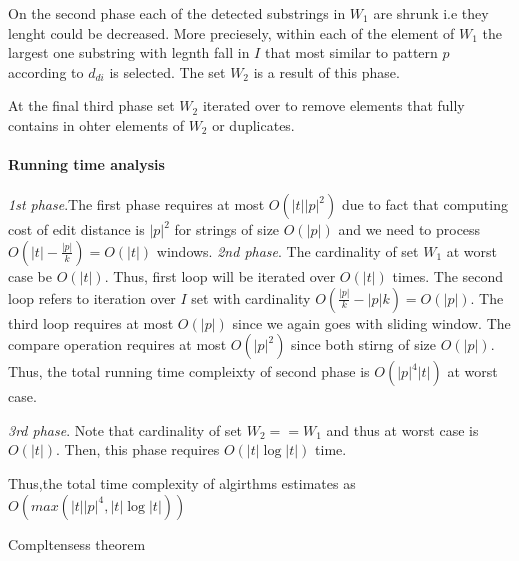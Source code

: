 On the second phase  each of the detected substrings in $W_{1}$ are shrunk i.e they lenght could be decreased.
More preciesely, within each of the element of $W_{1}$ the largest one substring with legnth fall in $I$ that most similar to pattern $p$ according to $d_{di}$ is selected.
The set $W_{2}$ is a result of this phase.

At the final third phase  set $W_{2}$ iterated over to remove elements that fully contains in ohter elements of $W_{2}$ or duplicates.

\paragraph{Running time analysis}
\emph{1st phase}.The first phase requires at most  $O(|t||p|^2)$ due to fact
that computing cost of edit distance is $|p|^2$ for strings of size $O(|p|)$ and we need to process $O(|t|-\frac{|p|}{k})=O(|t|)$ windows.
\emph{2nd phase}. 
The cardinality of set $W_{1}$  at worst case be $O(|t|)$.
Thus, first loop will be iterated over $O(|t|)$ times.
The second loop refers to iteration over $I$ set with cardinality $O(\frac{|p|}{k}-|p|k) = O(|p|)$.
The third loop requires at most $O(|p|)$ since we again goes with sliding window.
The compare operation requires at most $O(|p|^2)$ since both
stirng of size $O(|p|)$.
Thus, the total running time compleixty of second phase is $O(|p|^4|t|)$ at worst case.

\emph{3rd phase}. 
Note that cardinality of set $W_{2}==W_{1}$ and thus at worst case is $O(|t|)$.
Then, this phase requires $O(|t| \log |t|)$ time. 

Thus,the total time complexity of algirthms estimates as 
$O(max(|t||p|^4,|t| \log|t|))$

\begin{theorem}\cite{Luciv}
Compltensess theorem
\end{theorem}

